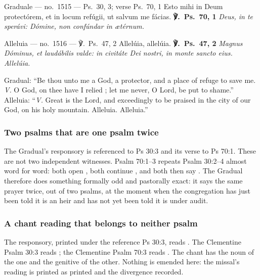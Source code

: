 \begin{appointed}{Graduale --- no.\ 1515 --- Ps.\ 30, 3; verse Ps.\ 70, 1}
Esto mihi in Deum protectórem, et in locum refúgii, ut salvum me fácias.
\upshape\textbf{℣.\ Ps.\ 70, 1} \itshape Deus, in te sperávi: Dómine, non
confúndar in ætérnum.
\end{appointed}

\begin{appointed}{Alleluia --- no.\ 1516 --- ℣.\ Ps.\ 47, 2}
Allelúia, allelúia. \upshape\textbf{℣.\ Ps.\ 47, 2} \itshape Magnus Dóminus, et
laudábilis valde: in civitáte Dei nostri, in monte sancto eius. Allelúia.
\end{appointed}

\begin{englishwitness}
Gradual: ``Be thou unto me a God, a protector, and a place of refuge to save
me. \emph{V.} O God, on thee have I relied ; let me never, O Lord, be put to
shame.'' Alleluia: ``\emph{V.} Great is the Lord, and exceedingly to be praised
in the city of our God, on his holy mountain. Alleluia. Alleluia.''
\end{englishwitness}

\subsubsection*{Two psalms that are one psalm twice}

The Gradual's responsory is referenced to Ps 30:3 and its verse to Ps 70:1.
These are not two independent witnesses. Psalm 70:1--3 repeats Psalm 30:2--4
almost word for word: both open , both continue , and both then say
. The Gradual
therefore does something formally odd and pastorally exact: it says the same
prayer twice, out of two psalms, at the moment when the congregation has just
been told it is an heir and has not yet been told it is under audit.

\subsubsection*{A chant reading that belongs to neither psalm}

The responsory, printed under the reference Ps 30:3, reads . The Clementine Psalm 30:3 reads ; the
Clementine Psalm 70:3 reads . The chant has the noun of
the one and the genitive of the other. Nothing is emended here: the missal's
reading is printed as printed and the divergence recorded.

